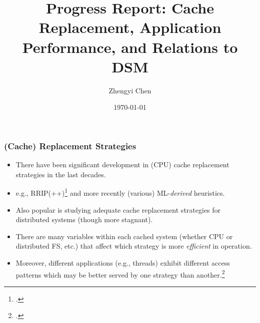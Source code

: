 \documentclass{beamer}
\title{Progress Report: Cache Replacement, Application Performance, and Relations to DSM}
\author{Zhengyi Chen} %
\date{\today}
\begin{document}
\frame{\titlepage}

\begin{frame}
    \frametitle{(Cache) Replacement Strategies}
    \begin{itemize}
        \item There have been significant development in (CPU) cache replacement strategies in the last decades.
        \item e.g., RRIP(++)\footcite{JTSE.2010.RRIP} and more recently (various) ML-\textit{derived} heuristics.
        \item Also popular is studying adequate cache replacement strategies for distributed systems (though more stagnant).
        \item There are many variables within each cached system (whether CPU or distributed FS, etc.) that affect which strategy is more \textit{efficient} in operation.
        \item Moreover, different applications (e.g., threads) exhibit different access patterns which may be better served by one strategy than another.\footcite{SYS.2021.RLR}
    \end{itemize}
\end{frame}
\end{document}
